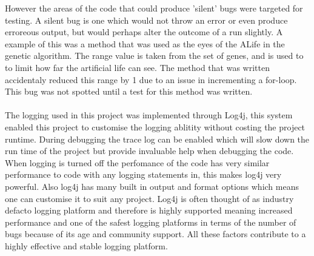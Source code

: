 \documentclass[12pt]{article}
\begin{document}
However the 
areas of the code that could produce 'silent' bugs were targeted for testing. A silent bug is one which would not throw an error
or even produce erroreous output, but would perhaps alter the outcome of a run slightly. A example of this was a method that
was used as the eyes of the ALife in the genetic algorithm. The range value is taken from the set of genes, and is used to 
to limit how far the artificial life can see. The method that was written accidentaly reduced this range by 1 due to an issue
in incrementing a for-loop. This bug was not spotted until a test for this method was written. 
\paragraph{}

The logging used in this project was implemented through Log4j, this system enabled this project to customise the logging 
ablitity without costing the project runtime. During debugging the trace log can be enabled which will slow down the
run time of the project but provide invaluable help when debugging the code. When logging is turned off the perfomance
of the code has very similar performance to code with any logging statements in, this makes log4j very powerful. Also
log4j has many built in output and format options which means one can customise it to suit any project. Log4j is often
thought of as industry defacto logging platform and therefore is highly supported meaning increased performance
and one of the safest logging platforms in terms of the number of bugs because of its age and community support. All these
factors contribute to a highly effective and stable logging platform. 
\end{document}

